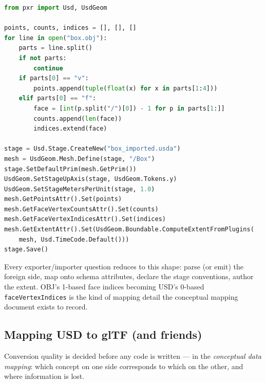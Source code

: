 \begin{lstlisting}[language=Python]
from pxr import Usd, UsdGeom

points, counts, indices = [], [], []
for line in open("box.obj"):
    parts = line.split()
    if not parts:
        continue
    if parts[0] == "v":
        points.append(tuple(float(x) for x in parts[1:4]))
    elif parts[0] == "f":
        face = [int(p.split("/")[0]) - 1 for p in parts[1:]]
        counts.append(len(face))
        indices.extend(face)

stage = Usd.Stage.CreateNew("box_imported.usda")
mesh = UsdGeom.Mesh.Define(stage, "/Box")
stage.SetDefaultPrim(mesh.GetPrim())
UsdGeom.SetStageUpAxis(stage, UsdGeom.Tokens.y)
UsdGeom.SetStageMetersPerUnit(stage, 1.0)
mesh.GetPointsAttr().Set(points)
mesh.GetFaceVertexCountsAttr().Set(counts)
mesh.GetFaceVertexIndicesAttr().Set(indices)
mesh.GetExtentAttr().Set(UsdGeom.Boundable.ComputeExtentFromPlugins(
    mesh, Usd.TimeCode.Default()))
stage.Save()
\end{lstlisting}

\noindent Every exporter/importer question reduces to this shape: parse (or
emit) the foreign side, map onto schema attributes, declare the stage
conventions, author the extent. OBJ's 1-based face indices becoming USD's
0-based \texttt{faceVertexIndices} is the kind of mapping detail the
conceptual mapping document exists to record.

\subsection{Mapping USD to glTF (and friends)}\label{sec:de-map}
Conversion quality is decided before any code is written --- in the
\emph{conceptual data mapping}: which concept on one side corresponds to
which on the other, and where information is lost.

